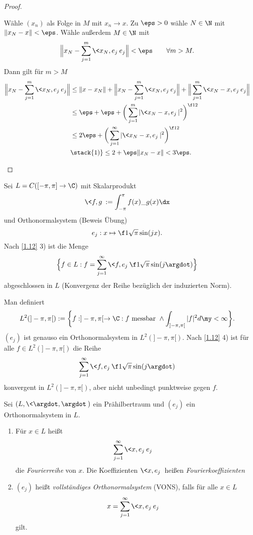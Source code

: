 \begin{st}
\begin{proof}
\begin{enumerate}[1)]
				Wähle $(x_n)$ als Folge in $M$ mit $x_n \to x$.
				Zu $\eps > 0$ wähle $N\in \N$ mit $\|x_N-x\| < \eps$.
				Wähle außerdem $M \in \N$ mit
				\[
					\Big\|x_N- \sum_{j=1}^m \<x_N,e_j\> e_j \Big\| < \eps
					\qquad \forall m > M.
				\]
				Dann gilt für $m > M$
				\begin{align*}
					\Big\|x_N- \sum_{j=1}^m \<x_N,e_j\> e_j \Big\| 
					&\le \|x-x_N\| + \Big\|x_N - \sum_{j=1}^m \<x_N,e_j\> e_j \Big\| + \Big\| \sum_{j=1}^m \<x_N-x,e_j\> e_j \Big\|	\\
					&\le \eps + \eps + \bigg(\sum_{j=1}^m |\<x_N-x,e_j\>|^2 \bigg)^{\f 12} \\
					&\le 2\eps + \bigg(\sum_{j=1}^\infty |\<x_N-x,e_j\>|^2 \bigg)^{\f 12} \\
					&\stack{1)}\le 2 + \eps\|x_N-x\|
					< 3 \eps.
				\end{align*}
		\end{enumerate}
	\end{proof}
\end{st}

\begin{ex} \label{1.13}
	Sei $L = C([-\pi,\pi] \to \C)$ mit Skalarprodukt
	\[
		\<f,g\> := \int_{-\pi}^{\pi}f(x)\_{g(x)} \dx
	\]
	und Orthonormalsystem (Beweis Übung)
	\[
		e_j : x \mapsto \f 1{\sqrt{\pi}} \sin(jx).
	\]
	Nach \ref{1.12} 3) ist die Menge
	\[
		\Big\{ f \in L : f = \sum_{j=1}^\infty \<f,e_j\> \f 1{\sqrt{\pi}}\sin(j \argdot) \Big\}
	\]
	abgeschlossen in $L$ (Konvergenz der Reihe bezüglich der induzierten Norm).

	Man definiert
	\[
		L^2(]-\pi,\pi[) := \bigg\{ f: ]-\pi,\pi[ \to \C : f \text{ messbar } \land \int_{]-\pi,\pi[}|f|^2 d\my < \infty \bigg\}.
	\]
	$(e_j)$ ist genauso ein Orthonormalsystem in $L^2(]-\pi,\pi[)$.
	Nach \ref{1.12} 4) ist für alle $f \in L^2(]-\pi,\pi[)$ die Reihe
	\[
		\sum_{j=1}^\infty \<f,e_j\> \f 1{\sqrt{\pi}} \sin(j \argdot)
	\]
	konvergent in $L^2(]-\pi,\pi[)$, aber nicht unbedingt punktweise gegen $f$.
\end{ex}

\begin{df} \label{1.14}
	Sei $(L, \<\argdot,\argdot\>)$ ein Prähilbertraum und $(e_j)$ ein Orthonormalsystem in $L$.
	\begin{enumerate}[1)]
		\item
			Für $x\in L$ heißt
			\[
				\sum_{j=1}^\infty \<x,e_j\> e_j
			\]
			die \emph{Fourierreihe} von $x$.
			Die Koeffizienten $\<x,e_j\>$ heißen \emph{Fourierkoeffizienten}
		\item
			$(e_j)$ heißt \emph{vollständiges Orthonormalsystem} (VONS), falls für alle $ x\in L $
			\[
				x = \sum_{j=1}^\infty \<x,e_j\> e_j
			\]
			gilt.
	\end{enumerate}
\end{df}

